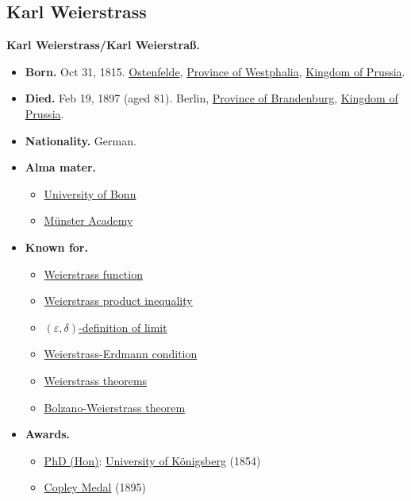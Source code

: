 \documentclass{article}
\begin{document}
\subsection{Karl Weierstrass}
\textbf{Karl Weierstrass/Karl Weierstraß.}
\begin{itemize}
	\item \textbf{Born.} Oct 31, 1815. \href{https://en.wikipedia.org/wiki/Ennigerloh}{Ostenfelde}, \href{https://en.wikipedia.org/wiki/Province_of_Westphalia}{Province of Westphalia}, \href{https://en.wikipedia.org/wiki/Kingdom_of_Prussia}{Kingdom of Prussia}.
	\item \textbf{Died.} Feb 19, 1897 (aged 81). Berlin, \href{https://en.wikipedia.org/wiki/Province_of_Brandenburg}{Province of Brandenburg}, \href{https://en.wikipedia.org/wiki/Kingdom_of_Prussia}{Kingdom of Prussia}.
	\item \textbf{Nationality.} German.
	\item \textbf{Alma mater.}
	\begin{itemize}
		\item \href{https://en.wikipedia.org/wiki/University_of_Bonn}{University of Bonn}
		\item \href{https://en.wikipedia.org/wiki/University_of_M%C3%BCnster}{Münster Academy}
	\end{itemize}
	\item \textbf{Known for.}
	\begin{itemize}
		\item \href{https://en.wikipedia.org/wiki/Weierstrass_function}{Weierstrass function}
		\item \href{https://en.wikipedia.org/wiki/Weierstrass_product_inequality}{Weierstrass product inequality}
		\item \href{https://en.wikipedia.org/wiki/(%CE%B5,_%CE%B4)-definition_of_limit}{$(\varepsilon,\delta)$-definition of limit}
		\item \href{https://en.wikipedia.org/wiki/Weierstrass%E2%80%93Erdmann_condition}{Weierstrass-Erdmann condition}
		\item \href{https://en.wikipedia.org/wiki/Weierstrass_theorem_(disambiguation)}{Weierstrass theorems}
		\item \href{https://en.wikipedia.org/wiki/Bolzano-Weierstrass_theorem}{Bolzano-Weierstrass theorem}
	\end{itemize}
	\item \textbf{Awards.}
	\begin{itemize}
		\item \href{https://en.wikipedia.org/wiki/PhD_(Hon)}{PhD (Hon)}: \href{https://en.wikipedia.org/wiki/University_of_K%C3%B6nigsberg}{University of Königsberg} (1854)
		\item \href{https://en.wikipedia.org/wiki/Copley_Medal}{Copley Medal} (1895)
	\end{itemize}
\end{itemize}
\end{document}
